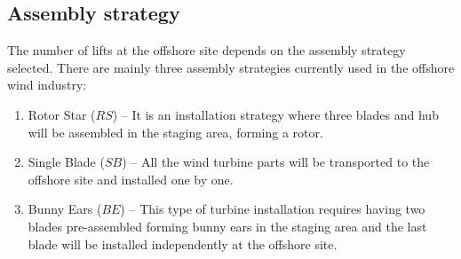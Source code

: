 \subsection{Assembly strategy}
The number of lifts at the offshore site depends on the assembly strategy selected. There are mainly three assembly strategies currently used in the offshore wind industry:

\begin{enumerate}
\item Rotor Star ($RS$) -- It is an installation strategy where three blades and hub will be assembled in the staging area, forming a rotor.
\item Single Blade ($SB$) -- All the wind turbine parts will be transported to the offshore site and installed one by one.
\item Bunny Ears ($BE$) -- This type of turbine installation requires having two blades pre-assembled forming bunny ears in the staging area and the last blade will be installed independently at the offshore site.
\end{enumerate}